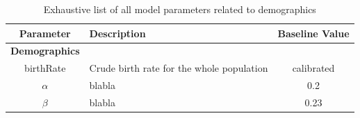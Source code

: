 \documentclass[11pt, onecolumn]{article}
\begin{document}
\begin{table}[htdp]

\begin{footnotesize}
\begin{center}
\begin{tabular}{|clc|}
\hline
\textbf{Parameter}  & \textbf{Description} & \textbf{Baseline Value}\\
\hline

\textbf{Demographics} & & \\
 birthRate & Crude birth rate for the whole population & calibrated\\
$\alpha$  & blabla & 0.2 \\
$\beta$  & blabla & 0.23 \\
\hline
\end{tabular}
\caption{Exhaustive list of all model parameters related to demographics}
\label{tab:demogAllParam}
\end{center}
\end{footnotesize}
\end{table}


\end{document}
